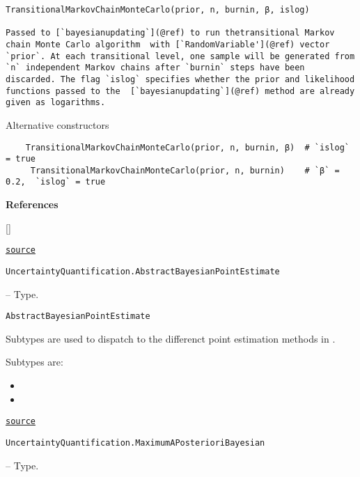 \begin{adjustwidth}{2em}{0pt}


\begin{verbatim}
TransitionalMarkovChainMonteCarlo(prior, n, burnin, β, islog)

Passed to [`bayesianupdating`](@ref) to run thetransitional Markov chain Monte Carlo algorithm  with [`RandomVariable'](@ref) vector `prior`. At each transitional level, one sample will be generated from `n` independent Markov chains after `burnin` steps have been discarded. The flag `islog` specifies whether the prior and likelihood functions passed to the  [`bayesianupdating`](@ref) method are already  given as logarithms.
\end{verbatim}

Alternative constructors


\begin{verbatim}
    TransitionalMarkovChainMonteCarlo(prior, n, burnin, β)  # `islog` = true
     TransitionalMarkovChainMonteCarlo(prior, n, burnin)    # `β` = 0.2,  `islog` = true
\end{verbatim}

\textbf{References}

[]



\href{https://github.com/friesischscott/UncertaintyQuantification.jl/blob/f5ee6cce729f0d6a57979257379c942cdf42f86f/src/modelupdating/bayesianupdating.jl#L134-L150}{\texttt{source}}


\end{adjustwidth}
\hypertarget{4470365816705975422}{\texttt{UncertaintyQuantification.AbstractBayesianPointEstimate}}  -- {Type.}

\begin{adjustwidth}{2em}{0pt}


\begin{verbatim}
AbstractBayesianPointEstimate
\end{verbatim}

Subtypes are used to dispatch to the differenct point estimation methods in .

Subtypes are:

\begin{itemize}
\item {}


\item {}

\end{itemize}


\href{https://github.com/friesischscott/UncertaintyQuantification.jl/blob/f5ee6cce729f0d6a57979257379c942cdf42f86f/src/UncertaintyQuantification.jl#L59-L68}{\texttt{source}}


\end{adjustwidth}
\hypertarget{7557579786475836974}{\texttt{UncertaintyQuantification.MaximumAPosterioriBayesian}}  -- {Type.}

